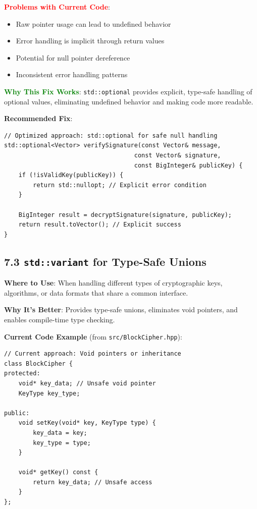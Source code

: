 \documentclass[11pt,a4paper]{article}
\begin{document}
\textcolor{red}{\textbf{Problems with Current Code}}:
\begin{itemize}
    \item Raw pointer usage can lead to undefined behavior
    \item Error handling is implicit through return values
    \item Potential for null pointer dereference
    \item Inconsistent error handling patterns
\end{itemize}

\textcolor{green}{\textbf{Why This Fix Works}}: \texttt{std::optional} provides explicit, type-safe handling of optional values, eliminating undefined behavior and making code more readable.

\textbf{Recommended Fix}:
\begin{lstlisting}
// Optimized approach: std::optional for safe null handling
std::optional<Vector> verifySignature(const Vector& message, 
                                    const Vector& signature,
                                    const BigInteger& publicKey) {
    if (!isValidKey(publicKey)) {
        return std::nullopt; // Explicit error condition
    }
    
    BigInteger result = decryptSignature(signature, publicKey);
    return result.toVector(); // Explicit success
}
\end{lstlisting}

\subsection{7.3 \texttt{std::variant} for Type-Safe Unions}

\textbf{Where to Use}: When handling different types of cryptographic keys, algorithms, or data formats that share a common interface.

\textbf{Why It's Better}: Provides type-safe unions, eliminates void pointers, and enables compile-time type checking.

\textbf{Current Code Example} (from \texttt{src/BlockCipher.hpp}):
\begin{lstlisting}
// Current approach: Void pointers or inheritance
class BlockCipher {
protected:
    void* key_data; // Unsafe void pointer
    KeyType key_type;
    
public:
    void setKey(void* key, KeyType type) {
        key_data = key;
        key_type = type;
    }
    
    void* getKey() const {
        return key_data; // Unsafe access
    }
};
\end{lstlisting}
\end{document}
